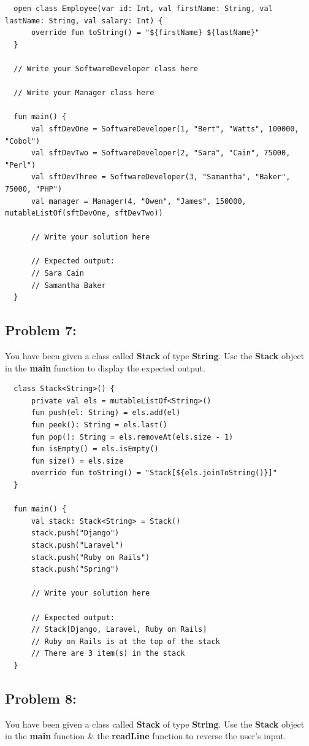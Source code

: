 \documentclass{article}
\begin{document}
\begin{verbatim}
  open class Employee(var id: Int, val firstName: String, val lastName: String, val salary: Int) {
      override fun toString() = "${firstName} ${lastName}"
  }

  // Write your SoftwareDeveloper class here

  // Write your Manager class here

  fun main() {
      val sftDevOne = SoftwareDeveloper(1, "Bert", "Watts", 100000, "Cobol")
      val sftDevTwo = SoftwareDeveloper(2, "Sara", "Cain", 75000, "Perl")
      val sftDevThree = SoftwareDeveloper(3, "Samantha", "Baker", 75000, "PHP")
      val manager = Manager(4, "Owen", "James", 150000, mutableListOf(sftDevOne, sftDevTwo))

      // Write your solution here

      // Expected output:
      // Sara Cain
      // Samantha Baker
  }
\end{verbatim}

\subsection*{Problem 7:}
You have been given a class called \textbf{Stack} of type \textbf{String}. Use the \textbf{Stack} object in the \textbf{main} function to display the expected output.

\begin{verbatim}
  class Stack<String>() {
      private val els = mutableListOf<String>()
      fun push(el: String) = els.add(el)
      fun peek(): String = els.last()
      fun pop(): String = els.removeAt(els.size - 1)
      fun isEmpty() = els.isEmpty()
      fun size() = els.size
      override fun toString() = "Stack[${els.joinToString()}]"
  }

  fun main() {
      val stack: Stack<String> = Stack()
      stack.push("Django")
      stack.push("Laravel")
      stack.push("Ruby on Rails")
      stack.push("Spring")

      // Write your solution here

      // Expected output:
      // Stack[Django, Laravel, Ruby on Rails]
      // Ruby on Rails is at the top of the stack
      // There are 3 item(s) in the stack
  }
\end{verbatim}

\subsection*{Problem 8:}
You have been given a class called \textbf{Stack} of type \textbf{String}. Use the \textbf{Stack} object in the \textbf{main} function \& the \textbf{readLine} function to reverse the user's input.
\end{document}
